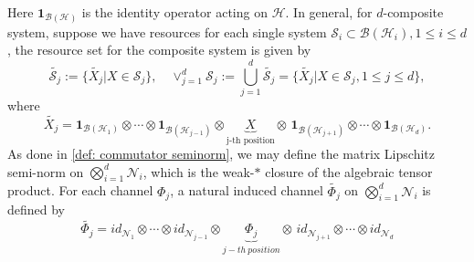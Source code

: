 \documentclass[11pt,reqno]{amsart}
\numberwithin{equation}{section}
\newcommand{\wt}{\widetilde}
\newcommand{\mc}{\mathcal}
\begin{document}
Here $\textbf{1}_{\mc B(\mc H)}$ is the identity operator acting on $\mc H$. In general, for $d$-composite system, suppose we have resources for each single system $\mc S_i \subset \mc B(\mc H_i), 1\le i \le d$, the resource set for the composite system is given by 
   \begin{equation}\label{def: composite resource}
    \wt{\mc S_j}:= \{\widetilde{X_j}\big|X \in \mc S_j\}, \quad \vee_{j=1}^d \mc S_j:= \bigcup_{j=1}^d \wt{\mc S_j}= \{\widetilde{X_j}\big|X \in \mc S_j, 1\le j\le d\},
   \end{equation}
where $$\widetilde{X_j} = \textbf{1}_{\mc B(\mc H_1)}\otimes \cdots \otimes \textbf{1}_{\mc B(\mc H_{j-1})} \otimes\underbrace{X}_{\text{j-th\ position}}  \otimes\, \textbf{1}_{\mc B(\mc H_{j+1})} \otimes \cdots \otimes \textbf{1}_{\mc B(\mc H_d)}.$$
As done in \eqref{def: commutator seminorm}, we may define the matrix Lipschitz semi-norm on $\bigotimes_{i=1}^d \mc N_i$, which is the weak-$*$ closure of the algebraic tensor product. For each channel $\Phi_j$, a natural induced channel $\wt{\Phi_j}$ on $\bigotimes_{i=1}^d \mc N_i$ is defined by 
\begin{equation}\label{def: embedded channel}
    \wt{\Phi_j} = id_{\mc N_1}\otimes \cdots \otimes id_{\mc N_{j-1}} \otimes\underbrace{\Phi_j}_{j-th\ position}  \otimes\, id_{\mc N_{j+1}} \otimes \cdots \otimes id_{\mc N_d}
\end{equation}
\end{document}
